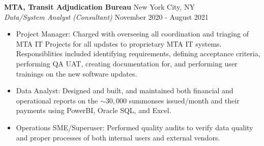\documentclass[a4paper]{article}
\begin{document}
\textbf{MTA, Transit Adjudication Bureau} \hfill New York City, NY\\
\textit{Data/System Analyst (Consultant)} \hfill November 2020 - August 2021\\
\vspace{-1mm}
\begin{itemize} \itemsep 1pt
    \item Project Manager: Charged with overseeing all coordination and triaging of MTA IT Projects for all updates to proprietary MTA IT systems.
            Responsiblities included identifying requirements, defining acceptance criteria, performing QA UAT, creating documentation for, and performing user trainings on the new software updates.
	\item Data Analyst: Designed and built, and maintained both financial and operational reports on the $\sim 30,000$ summonses issued/month and their payments using PowerBI, Oracle SQL, and Excel.
    \item Operations SME/Superuser: Performed quality audits to verify data quality and proper processes of both internal users and external vendors.
\end{itemize}
\end{document}
